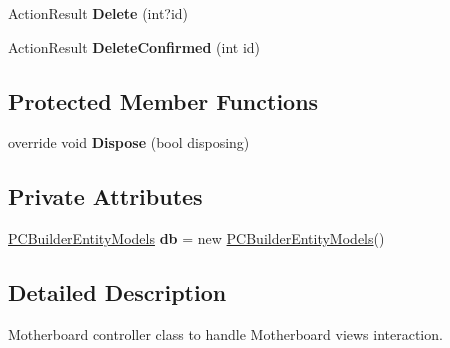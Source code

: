 \begin{DoxyCompactItemize}
\item 
Action\+Result {\bfseries Delete} (int?id)\hypertarget{class_p_c_builder_m_v_c_1_1_controllers_1_1_motherboard_controller_a03255789bef1157226db1f72785b2973}{}\label{class_p_c_builder_m_v_c_1_1_controllers_1_1_motherboard_controller_a03255789bef1157226db1f72785b2973}

\item 
Action\+Result {\bfseries Delete\+Confirmed} (int id)\hypertarget{class_p_c_builder_m_v_c_1_1_controllers_1_1_motherboard_controller_af944aebfcedf214c0182632f0082457b}{}\label{class_p_c_builder_m_v_c_1_1_controllers_1_1_motherboard_controller_af944aebfcedf214c0182632f0082457b}

\end{DoxyCompactItemize}
\subsection*{Protected Member Functions}
\begin{DoxyCompactItemize}
\item 
override void {\bfseries Dispose} (bool disposing)\hypertarget{class_p_c_builder_m_v_c_1_1_controllers_1_1_motherboard_controller_a1eedae183eaf739df0fda184eefb0233}{}\label{class_p_c_builder_m_v_c_1_1_controllers_1_1_motherboard_controller_a1eedae183eaf739df0fda184eefb0233}

\end{DoxyCompactItemize}
\subsection*{Private Attributes}
\begin{DoxyCompactItemize}
\item 
\hyperlink{class_p_c_builder_m_v_c_1_1_models_1_1_p_c_builder_entity_models}{P\+C\+Builder\+Entity\+Models} {\bfseries db} = new \hyperlink{class_p_c_builder_m_v_c_1_1_models_1_1_p_c_builder_entity_models}{P\+C\+Builder\+Entity\+Models}()\hypertarget{class_p_c_builder_m_v_c_1_1_controllers_1_1_motherboard_controller_aab8ffaf60c4310a2c64dfce1a4331e9a}{}\label{class_p_c_builder_m_v_c_1_1_controllers_1_1_motherboard_controller_aab8ffaf60c4310a2c64dfce1a4331e9a}

\end{DoxyCompactItemize}


\subsection{Detailed Description}
Motherboard controller class to handle Motherboard views interaction. 

